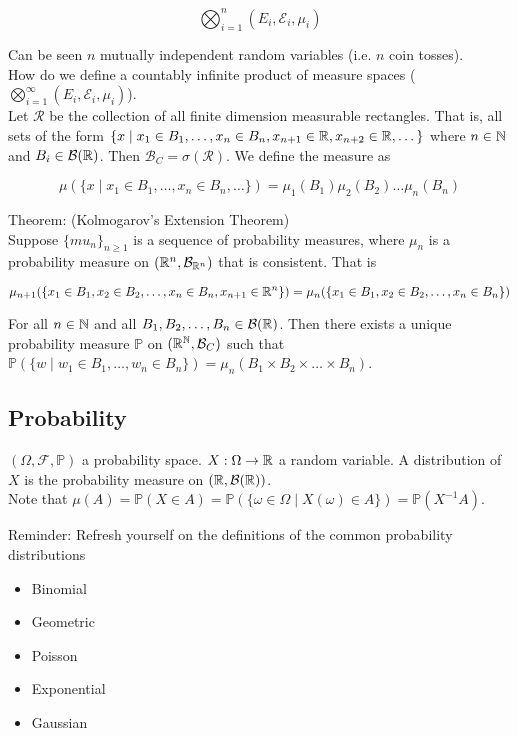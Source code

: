 \documentclass[english, 11pt]{article}
\begin{document}
\[\bigotimes_{i = 1}^n (E_i, \mathcal{E}_i, \mu_i)\]

Can be seen $n$ mutually independent random variables (i.e. $n$ coin tosses).\\

How do we define a countably infinite product of measure spaces ($\bigotimes_{i = 1}^\infty (E_i, \mathcal{E}_i, \mu_i)$).\\

Let $\mathcal{R}$ be the collection of all finite dimension measurable rectangles. That is, all sets of the form $\{ x \mid x_1 \in B_1, \dots, x_n \in B_n, x_{n + 1} \in {\mathbb{R}}, x_{n + 2} \in {\mathbb{R}}, \dots \}$ where $n \in {\mathbb{N}}$ and $B_i \in \mathcal{B}({\mathbb{R}})$. Then $\mathcal{B}_C = \sigma(\mathcal{R})$. We define the measure as

\[\mu(\{x \mid x_1 \in B_1, \dots, x_n \in B_n, \dots\}) = \mu_1(B_1)\mu_2(B_2)\dots\mu_n(B_n)\] 

Theorem: (Kolmogarov's Extension Theorem)\\
Suppose $\{mu_n\}_{n \geq 1}$ is a sequence of probability measures, where $\mu_n$ is a probability measure on $({\mathbb{R}}^n, \mathcal{B}_{{\mathbb{R}}^n})$ that is consistent. That is

\[\mu_{n + 1}(\{x_1 \in B_1, x_2 \in B_2, \dots, x_n \in B_n, x_{n+1} \in {\mathbb{R}}^n\}) = \mu_n(\{x_1 \in B_1, x_2 \in B_2, \dots, x_n \in B_n \})\]

For all $n \in {\mathbb{N}}$ and all $B_1, B_2, \dots, B_n \in \mathcal{B}({\mathbb{R}})$. Then there exists a unique probability measure $\mathbb{P}$ on $({\mathbb{R}}^{\mathbb{N}}, \mathcal{B}_C)$ such that $\mathbb{P}(\{w \mid w_1 \in B_1, \dots, w_n \in B_n\}) = \mu_n(B_1 \times B_2 \times \dots \times B_n)$.

\subsection{Probability}
$(\Omega, \mathcal{F}, \mathbb{P})$ a probability space. $X: \Omega \to {\mathbb{R}}$ a random variable. A distribution of $X$ is the probability measure on $({\mathbb{R}}, \mathcal{B}({\mathbb{R}}))$.\\

Note that $\mu(A) = \mathbb{P}(X \in A) = \mathbb{P}(\{\omega \in \Omega \mid X(\omega) \in A \}) = \mathbb{P}(X^{-1}A)$.

Reminder: Refresh yourself on the definitions of the common probability distributions

\begin{itemize}
	\item Binomial
	\item Geometric
	\item Poisson
	\item Exponential
	\item Gaussian
\end{itemize}
\end{document}
